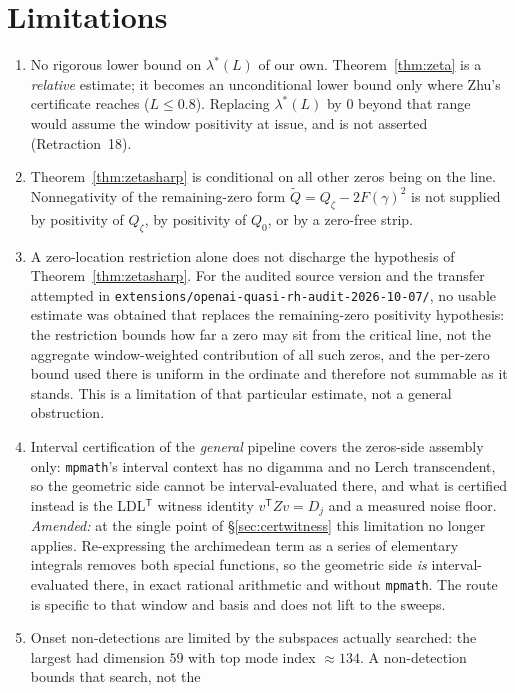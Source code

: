 \documentclass[11pt,a4paper]{article}
\theoremstyle{definition}
\theoremstyle{remark}
\newcommand{\lstar}{\lambda^{*}}
\newcommand{\src}[1]{{\footnotesize\texttt{#1}}}
\begin{document}
\section{Limitations}\label{sec:limits}

\begin{enumerate}\itemsep2pt
\item No rigorous lower bound on $\lstar(L)$ of our own. Theorem~\ref{thm:zeta} is a
\emph{relative} estimate; it becomes an unconditional lower bound only where Zhu's certificate
reaches ($L\le0.8$). Replacing $\lstar(L)$ by $0$ beyond that range would assume the window
positivity at issue, and is not asserted (Retraction~18).
\item Theorem~\ref{thm:zetasharp} is conditional on all other zeros being on the line.
Nonnegativity of the remaining-zero form $\widetilde Q=Q_\zeta-2F(\gamma)^{2}$ is not supplied
by positivity of $Q_\zeta$, by positivity of $Q_0$, or by a zero-free strip.
\item A zero-location restriction alone does not discharge the hypothesis of
Theorem~\ref{thm:zetasharp}. For the audited source version and the transfer attempted in
\src{extensions/openai-\allowbreak quasi-rh-\allowbreak audit-2026-10-07/}, no usable estimate
was obtained that
replaces the remaining-zero positivity hypothesis: the restriction bounds how far a zero may
sit from the critical line, not the aggregate window-weighted contribution of all such zeros,
and the per-zero bound used there is uniform in the ordinate and therefore not summable as it
stands. This is a limitation of that particular estimate, not a general obstruction.
\item Interval certification of the \emph{general} pipeline covers the zeros-side assembly
only: \texttt{mpmath}'s interval context has no digamma and no Lerch transcendent, so the
geometric side cannot be interval-evaluated there, and what is certified instead is the
LDL$^{\mathsf T}$ witness identity $v^{\mathsf T}Zv=D_j$ and a measured noise floor.
\emph{Amended:} at the single point of \S\ref{sec:certwitness} this limitation no longer
applies. Re-expressing the archimedean term as a series of elementary integrals removes both
special functions, so the geometric side \emph{is} interval-evaluated there, in exact
rational arithmetic and without \texttt{mpmath}. The route is specific to that window and
basis and does not lift to the sweeps.
\item Onset non-detections are limited by the subspaces actually searched: the largest had
dimension $59$ with top mode index $\approx134$. A non-detection bounds that search, not the

\end{enumerate}
\end{document}
